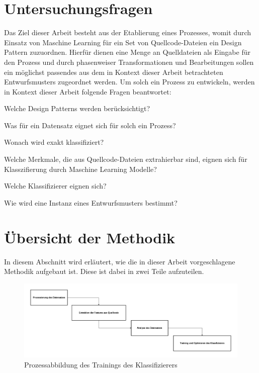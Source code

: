 \pagebreak

\section{Untersuchungsfragen}

Das Ziel dieser Arbeit besteht aus der Etablierung eines Prozesses, womit durch Einsatz von Maschine Learning für ein Set von Quellcode-Dateien ein Design Pattern zuzuordnen.
Hierfür dienen eine Menge an Quelldateien als Eingabe für den Prozess und durch phasenweiser Transformationen und Bearbeitungen sollen ein möglichst passendes aus dem in Kontext dieser Arbeit betrachteten Entwurfsmusters zugeordnet werden.
Um solch ein Prozess zu entwickeln, werden in Kontext dieser Arbeit folgende Fragen beantwortet:

\begin{questions}
    \item\label{RQ1} Welche Design Patterns werden berücksichtigt?
    \item\label{RQ2} Was für ein Datensatz eignet sich für solch ein Prozess?
    \item\label{RQ3} Wonach wird exakt klassifiziert?
    \item\label{RQ4} Welche Merkmale, die aus Quellcode-Dateien extrahierbar sind, eignen sich für Klasszifierung durch Maschine Learning Modelle?  
    \item\label{RQ5} Welche Klassifizierer eignen sich?
    \item\label{RQ6} Wie wird eine Instanz eines Entwurfsmusters bestimmt?
\end{questions}


\section{Übersicht der Methodik}

In diesem Abschnitt wird erläutert, wie die in dieser Arbeit vorgeschlagene Methodik aufgebaut ist. 
Diese ist dabei in zwei Teile aufzuteilen.

\begin{figure}[h]
    \centering
    \includegraphics[scale=0.45]{figures/training_overview.png}
    \caption{Prozessabbildung des Trainings des Klassifizierers}
    \label{fig:training_process}
\end{figure}


